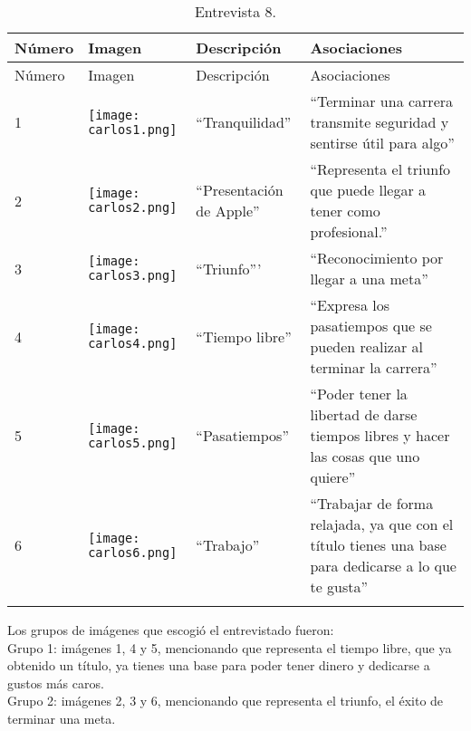 \begin{longtable}{>{\centering\arraybackslash}m{1cm} >{\centering\arraybackslash}m{2cm} >{\arraybackslash}m{5cm}>{\arraybackslash}m{5cm}}
	
	\hline
	Número & Imagen & Descripción & Asociaciones \\
	\hline \hline
	\endfirsthead
	
	\hline
	Número & Imagen & Descripción & Asociaciones \\
	\hline \hline
	\endhead

1 & \texttt{[image: carlos1.png]} & ``Tranquilidad'' & ``Terminar una carrera transmite seguridad y sentirse útil para algo'' \\
\hline

2 & \texttt{[image: carlos2.png]} & ``Presentación de Apple'' & ``Representa el triunfo que puede llegar a tener como profesional.'' \\
\hline

3 & \texttt{[image: carlos3.png]} & ``Triunfo''' & ``Reconocimiento por llegar a una meta'' \\
\hline

4 & \texttt{[image: carlos4.png]} & ``Tiempo libre'' & ``Expresa los pasatiempos que se pueden realizar al terminar la carrera'' \\
\hline

5 & \texttt{[image: carlos5.png]} & ``Pasatiempos'' & ``Poder tener la libertad de darse tiempos libres y hacer las cosas que uno quiere'' \\
\hline

6 & \texttt{[image: carlos6.png]} & ``Trabajo'' & ``Trabajar de forma relajada, ya que con el título tienes una base para dedicarse a lo que te gusta'' \\
\hline



\caption{Entrevista 8.}
\label{tabla:carlos}
\end{longtable}

Los grupos de imágenes que escogió el entrevistado fueron:\\


Grupo 1: imágenes 1, 4 y 5, mencionando que representa el tiempo libre, que ya obtenido un título, ya tienes una base para poder tener dinero y dedicarse a gustos más caros. \\

Grupo 2: imágenes 2, 3 y 6, mencionando que representa el triunfo, el éxito de terminar una meta.\\


